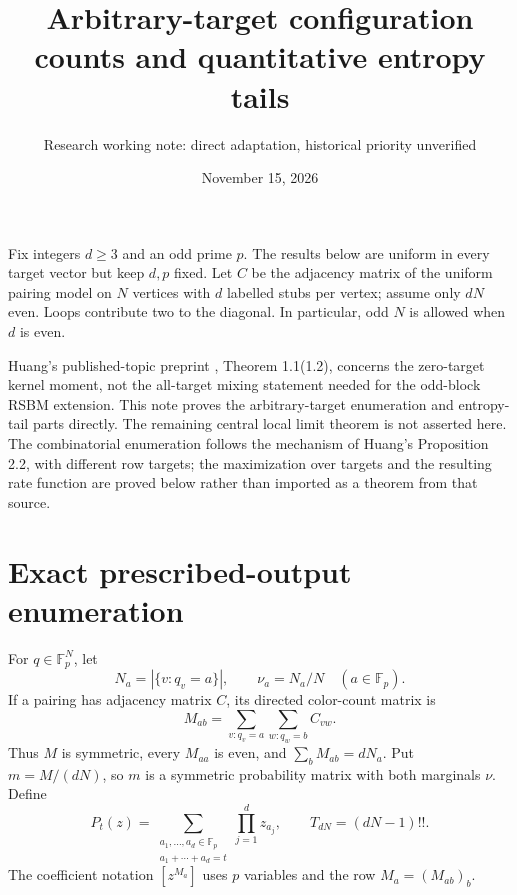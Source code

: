 \documentclass[11pt]{article}
\title{Arbitrary-target configuration counts and quantitative entropy tails}
\author{Research working note: direct adaptation, historical priority unverified}
\date{November 15, 2026}
\newcommand{\Fp}{\mathbb F_p}
\begin{document}
\maketitle

Fix integers $d\ge3$ and an odd prime $p$. The results below are uniform in
every target vector but keep $d,p$ fixed. Let $C$ be the adjacency matrix
of the uniform pairing model on $N$ vertices with $d$ labelled stubs per
vertex; assume only $dN$ even. Loops contribute two to the diagonal.
In particular, odd $N$ is allowed when $d$ is even.

Huang's published-topic preprint \cite{huang}, Theorem 1.1(1.2), concerns
the zero-target kernel moment, not the all-target mixing statement needed
for the odd-block RSBM extension. This note proves the arbitrary-target
enumeration and entropy-tail parts directly. The remaining central local
limit theorem is not asserted here. The combinatorial enumeration follows
the mechanism of Huang's Proposition 2.2, with different row targets;
the maximization over targets and the resulting rate function are proved
below rather than imported as a theorem from that source.

\section{Exact prescribed-output enumeration}
For $q\in\Fp^N$, let
\[
 N_a=|\{v:q_v=a\}|,\qquad \nu_a=N_a/N \quad(a\in\Fp).
\]
If a pairing has adjacency matrix $C$, its directed color-count matrix is
\[
 M_{ab}=\sum_{v:q_v=a}\sum_{w:q_w=b} C_{vw}.
\]
Thus $M$ is symmetric, every $M_{aa}$ is even, and
$\sum_b M_{ab}=dN_a$. Put $m=M/(dN)$, so $m$ is a symmetric probability
matrix with both marginals $\nu$. Define
\[
 P_t(z)=\sum_{\substack{a_1,\ldots,a_d\in\Fp\\a_1+\cdots+a_d=t}}
                \prod_{j=1}^d z_{a_j},
\qquad T_{dN}=(dN-1)!!.
\]
The coefficient notation $[z^{M_a}]$ uses $p$ variables and the row
$M_a=(M_{ab})_b$.
\end{document}
